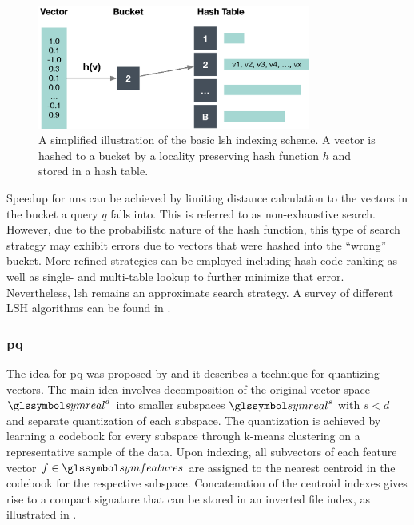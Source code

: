 \begin{figure}[tb]
    \centering
    \includegraphics[width=0.80\textwidth]{figures/lsh}
    \caption{A simplified illustration of the basic \acrshort{lsh} indexing scheme. A vector is hashed to a bucket by a locality preserving hash function $h$ and stored in a hash table.}
    \label{fig:lsh}
\end{figure}

Speedup for \acrshort{nns} can be achieved by limiting distance calculation to the vectors in the bucket a query $q$ falls into. This is referred to as non-exhaustive search. However, due to the probabilistc nature of the hash function, this type of search strategy may exhibit errors due to vectors that were hashed into the ``wrong'' bucket. More refined strategies can be employed including hash-code ranking as well as single- and multi-table lookup \cite{Wang:2017ASurvey} to further minimize that error. Nevertheless, \acrshort{lsh} remains an approximate search strategy. A survey of different LSH algorithms can be found in \cite{Wang:2017ASurvey}.

\subsubsection{\acrfull{pq}}

The idea for \acrshort{pq} was proposed by \cite{Jegou:2010Product} and it describes a technique for quantizing vectors. The main idea involves decomposition of the original vector space $\symreal^d$ into smaller subspaces $\symreal^s$ with $s < d$ and separate quantization of each subspace. The quantization is achieved by learning a codebook for every subspace through k-means clustering on a representative sample of the data. Upon indexing, all subvectors of each feature vector $f \in \symfeatures$ are assigned to the nearest centroid in the codebook for the respective subspace. Concatenation of the centroid indexes gives rise to a compact signature that can be stored in an inverted file index, as illustrated in .


